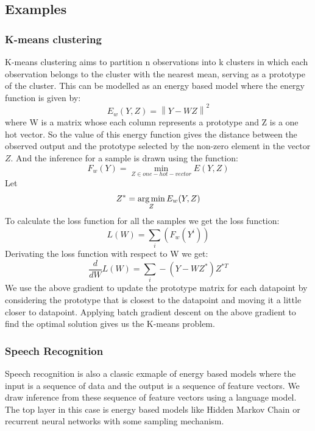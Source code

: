 \subsection{Examples}
\subsubsection{K-means clustering}
K-means clustering aims to partition n observations into k clusters in which each observation belongs to the cluster with the nearest mean, serving as a prototype of the cluster. This can be modelled as an energy based model where the energy function is given by:
\begin{equation}
    E_{w}(Y,Z) = \left\|Y - WZ \right \|^{2}
\end{equation}
where W is a matrix whose each column represents a prototype and Z is a one hot vector. So the value of this energy function gives the distance between the observed output and the prototype selected by the non-zero element in the vector $Z$.
And the inference for a sample is drawn using the function:
\begin{equation}
    F_{w}(Y) = \min_{Z \in one-hot-vector} E(Y, Z)
\end{equation}
Let 
\begin{equation}
    Z^{*} = \argmin_{Z} E_{w}(Y, Z)
\end{equation}
To calculate the loss function for all the samples we get the loss function:
\begin{equation}
    L(W) = \sum_{i}(F_{w}(Y^{i}))
\end{equation}
Derivating the loss function with respect to W we get:
\begin{equation}
    \frac{d}{dW} L(W) = \sum_{i}-(Y - WZ^{*}) Z^{*T}
\end{equation}
We use the above gradient to update the prototype matrix for each datapoint by considering the prototype that is closest to the datapoint and moving it a little closer to datapoint. Applying batch gradient descent on the above gradient to find the optimal solution gives us the K-means problem.

\subsubsection{Speech Recognition}
Speech recognition is also a classic exmaple of energy based models where the input is a sequence of data and the output is a sequence of feature vectors. We draw inference from these sequence of feature vectors using a language model. The top layer in this case is energy based models like Hidden Markov Chain or recurrent neural networks with some sampling mechanism.

